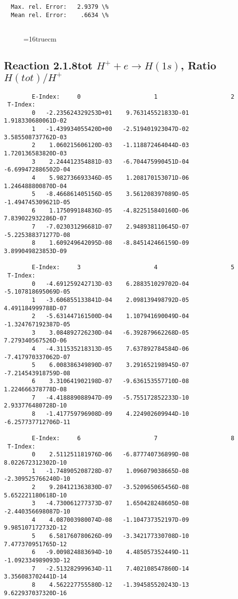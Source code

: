 \documentclass[12pt,dvipdfmx]{article}
\begin{document}
{\begin{small}
\begin{verbatim}
  Max. rel. Error:   2.9379 \%
  Mean rel. Error:    .6634 \%


\end{verbatim}\end{small}
\begin{figure} \label{2.1.8re}
\epsfxsize=16truecm
\end{figure}
\newpage


\subsection{
Reaction 2.1.8tot  $H^+ + e \rightarrow H(1s) $, Ratio $H(tot)/H^+$
}

\begin{small}\begin{verbatim}
        E-Index:     0                     1                     2
 T-Index:
        0   -2.235624329253D+01    9.763145521833D-01    1.918330680061D-02
        1   -1.439934055420D+00   -2.519401923047D-02    3.585508737762D-03
        2    1.060215606120D-03   -1.118872464044D-03    1.720136583820D-03
        3    2.244412354881D-03   -6.704475990451D-04   -6.699472886502D-04
        4    5.982736693346D-05    1.208170153071D-06    1.246488800870D-04
        5   -8.466861405156D-05    3.561208397089D-05   -1.494745309621D-05
        6    1.175099184836D-05   -4.822515840160D-06    7.839022932286D-07
        7   -7.023031296681D-07    2.948938110645D-07   -5.225388371277D-08
        8    1.609249642095D-08   -8.845142466159D-09    3.899049823853D-09

        E-Index:     3                     4                     5
 T-Index:
        0   -4.691259242713D-03    6.288351029702D-04   -5.107818695069D-05
        1   -3.606855133841D-04    2.098139498792D-05    4.491184999788D-07
        2   -5.631447161500D-04    1.107941690049D-04   -1.324767192387D-05
        3    3.084892726230D-04   -6.392879662268D-05    7.279340567526D-06
        4   -4.311535218313D-05    7.637892784584D-06   -7.417970337062D-07
        5    6.008386349890D-07    3.291652198945D-07   -7.214543918759D-08
        6    3.310641902198D-07   -9.636153557710D-08    1.224666378778D-08
        7   -4.418889088947D-09   -5.755172852233D-10    2.933776480728D-10
        8   -1.417759796908D-09    4.224902609944D-10   -6.257737712706D-11

        E-Index:     6                     7                     8
 T-Index:
        0    2.511251181976D-06   -6.877740736899D-08    8.022672312302D-10
        1   -1.748905208728D-07    1.096079038665D-08   -2.309525766240D-10
        2    9.284121363830D-07   -3.520965065456D-08    5.652221180618D-10
        3   -4.730061277373D-07    1.650428248605D-08   -2.440356698087D-10
        4    4.087003980074D-08   -1.104737352197D-09    9.985107172732D-12
        5    6.581760780626D-09   -3.342177330708D-10    7.477370951765D-12
        6   -9.009824883694D-10    4.485057352449D-11   -1.092334989093D-12
        7   -2.513282999634D-11    7.402108547860D-14    3.356083702441D-14
        8    4.562227755580D-12   -1.394585520243D-13    9.622937037320D-16


\end{verbatim}
\end{small}}
\end{document}
